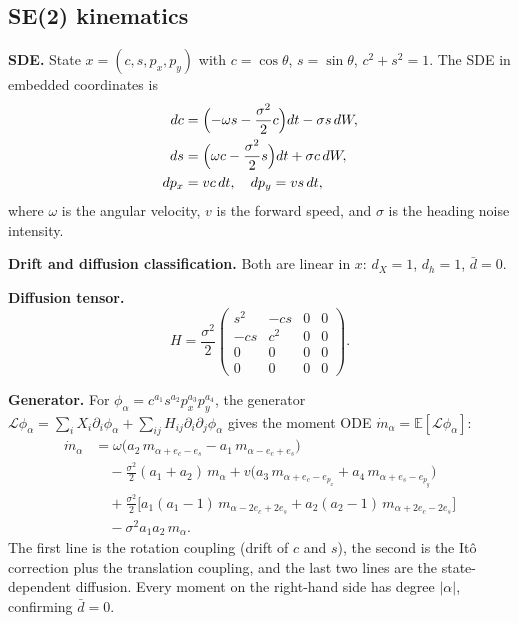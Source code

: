 \documentclass{article}
\newcommand{\E}{\mathbb{E}}
\theoremstyle{definition}
\begin{document}
\subsection{SE(2) kinematics}

\textbf{SDE.}
State $x = (c, s, p_x, p_y)$ with $c = \cos\theta$, $s = \sin\theta$,
$c^2 + s^2 = 1$.
The SDE in embedded coordinates is
\begin{align}
    dc  &= \Bigl(-\omega s - \frac{\sigma^2}{2} c\Bigr) dt
         - \sigma s\, dW, \nonumber\\
    ds  &= \Bigl(\omega c - \frac{\sigma^2}{2} s\Bigr) dt
         + \sigma c\, dW, \nonumber\\
    dp_x &= v c\, dt, \quad dp_y = v s\, dt,
\end{align}
where $\omega$ is the angular velocity, $v$ is the forward speed,
and $\sigma$ is the heading noise intensity.

\textbf{Drift and diffusion classification.}
Both are linear in $x$:
$d_X = 1$, $d_h = 1$, $\bar{d} = 0$.

\textbf{Diffusion tensor.}
\begin{equation}
    H = \frac{\sigma^2}{2}
    \begin{pmatrix}
        s^2 & -cs & 0 & 0 \\
        -cs & c^2 & 0 & 0 \\
        0   & 0   & 0 & 0 \\
        0   & 0   & 0 & 0
    \end{pmatrix}.
\end{equation}

\textbf{Generator.}
For $\phi_\alpha = c^{a_1} s^{a_2} p_x^{a_3} p_y^{a_4}$,
the generator $\mathcal{L}\phi_\alpha = \sum_i X_i \partial_i \phi_\alpha
+ \sum_{ij} H_{ij} \partial_i \partial_j \phi_\alpha$ gives the moment ODE
$\dot{m}_\alpha = \E[\mathcal{L}\phi_\alpha]$:
\begin{align}
    \dot{m}_\alpha
    &= \omega\bigl(a_2\, m_{\alpha+e_c-e_s}
    - a_1\, m_{\alpha-e_c+e_s}\bigr)
    \nonumber\\
    &\quad - \frac{\sigma^2}{2}(a_1{+}a_2)\, m_\alpha
    + v\bigl(a_3\, m_{\alpha+e_c-e_{p_x}}
    + a_4\, m_{\alpha+e_s-e_{p_y}}\bigr)
    \nonumber\\
    &\quad + \frac{\sigma^2}{2}\bigl[
    a_1(a_1{-}1)\, m_{\alpha-2e_c+2e_s}
    + a_2(a_2{-}1)\, m_{\alpha+2e_c-2e_s}\bigr]
    \nonumber\\
    &\quad - \sigma^2 a_1 a_2\, m_\alpha.
\end{align}
The first line is the rotation coupling (drift of $c$ and $s$),
the second is the It\^o correction plus the translation coupling,
and the last two lines are the state-dependent diffusion.
Every moment on the right-hand side has degree $|\alpha|$,
confirming $\bar{d} = 0$.
\end{document}
